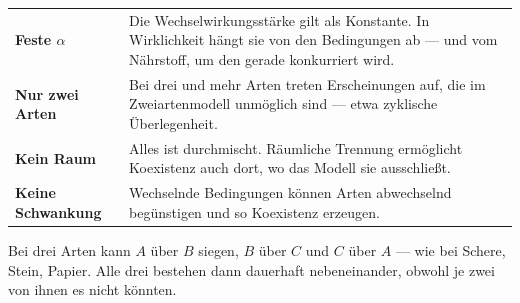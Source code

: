\begin{warnung}
\begin{center}
{\small
\renewcommand{\arraystretch}{1.52}
\begin{tabular}{@{}P{2.8cm}P{5.8cm}@{}}
\toprule
\textbf{Feste $\alpha$} & Die Wechselwirkungsstärke gilt als Konstante. In Wirklichkeit hängt sie von den Bedingungen ab --- und vom Nährstoff, um den gerade konkurriert wird.\\
\textbf{Nur zwei Arten} & Bei drei und mehr Arten treten Erscheinungen auf, die im Zweiartenmodell unmöglich sind --- etwa zyklische Überlegenheit.\\
\textbf{Kein Raum} & Alles ist durchmischt. Räumliche Trennung ermöglicht Koexistenz auch dort, wo das Modell sie ausschließt.\\
\textbf{Keine Schwankung} & Wechselnde Bedingungen können Arten abwechselnd begünstigen und so Koexistenz erzeugen.\\
\bottomrule
\end{tabular}}
\end{center}

Bei drei Arten kann $A$ über $B$ siegen, $B$ über $C$ und $C$ über $A$ --- wie bei Schere, Stein, Papier. Alle drei bestehen dann dauerhaft nebeneinander, obwohl je zwei von ihnen es nicht könnten.

\begin{center}
\end{center}

\begin{center}
\begin{minipage}{0.88\textwidth}
\end{minipage}
\end{center}
\end{warnung}

